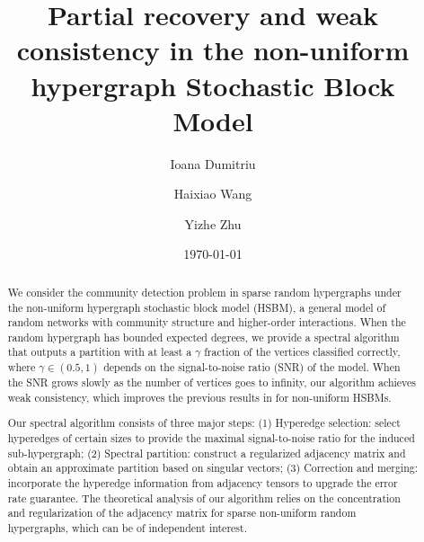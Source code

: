 \documentclass[10pt]{amsart}
\numberwithin{equation}{section}
\theoremstyle{plain}
\theoremstyle{remark}
\begin{document}
\title{Partial recovery and weak consistency in the non-uniform hypergraph Stochastic Block Model}

\author{Ioana Dumitriu}
\address{Department of Mathematics, University of California, San Diego, La Jolla, CA 92093}

\author{Haixiao Wang}
\address{Department of Mathematics, University of California, San Diego, La Jolla, CA 92093}

\author{Yizhe Zhu}
\address{Department of Mathematics, University of California, San Diego, La Jolla, CA 92093}

\date{\today}

\begin{abstract}

 We consider the community detection problem in sparse random hypergraphs under the non-uniform hypergraph stochastic block model (HSBM), a  general model of random networks with community structure and  higher-order interactions. When the random hypergraph has bounded expected degrees, we provide a  spectral algorithm that outputs a partition with at least a $\gamma$ fraction of the vertices  classified correctly, where $\gamma\in (0.5,1)$ depends on the signal-to-noise ratio (SNR) of the model. When the SNR  grows slowly as the number of vertices goes to infinity, our algorithm achieves weak consistency, which improves the previous  results in  %
 \cite{ghoshdastidar2017consistency} for non-uniform HSBMs.
 
 Our spectral algorithm consists of  three major steps: (1) Hyperedge selection: select hyperedges of certain sizes to provide the maximal signal-to-noise ratio for the induced sub-hypergraph; (2) Spectral partition: construct a regularized adjacency matrix and obtain an approximate partition based on singular vectors; (3) Correction and merging: incorporate the hyperedge information from adjacency tensors to upgrade the error rate guarantee. The theoretical analysis of our algorithm relies on the concentration and regularization of the adjacency matrix for sparse non-uniform random hypergraphs, which can be of independent interest.
\end{abstract}

\maketitle







\appendix
{}



\end{document}
